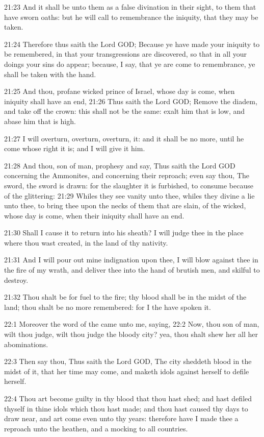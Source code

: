 21:23 And it shall be unto them as a false divination in their sight,
to them that have sworn oaths: but he will call to remembrance the
iniquity, that they may be taken.

21:24 Therefore thus saith the Lord GOD; Because ye have made your
iniquity to be remembered, in that your transgressions are discovered,
so that in all your doings your sins do appear; because, I say, that
ye are come to remembrance, ye shall be taken with the hand.

21:25 And thou, profane wicked prince of Israel, whose day is come,
when iniquity shall have an end, 21:26 Thus saith the Lord GOD; Remove
the diadem, and take off the crown: this shall not be the same: exalt
him that is low, and abase him that is high.

21:27 I will overturn, overturn, overturn, it: and it shall be no
more, until he come whose right it is; and I will give it him.

21:28 And thou, son of man, prophesy and say, Thus saith the Lord GOD
concerning the Ammonites, and concerning their reproach; even say
thou, The sword, the sword is drawn: for the slaughter it is
furbished, to consume because of the glittering: 21:29 Whiles they see
vanity unto thee, whiles they divine a lie unto thee, to bring thee
upon the necks of them that are slain, of the wicked, whose day is
come, when their iniquity shall have an end.

21:30 Shall I cause it to return into his sheath? I will judge thee in
the place where thou wast created, in the land of thy nativity.

21:31 And I will pour out mine indignation upon thee, I will blow
against thee in the fire of my wrath, and deliver thee into the hand
of brutish men, and skilful to destroy.

21:32 Thou shalt be for fuel to the fire; thy blood shall be in the
midst of the land; thou shalt be no more remembered: for I the \LORD
have spoken it.

22:1 Moreover the word of the \LORD came unto me, saying, 22:2 Now,
thou son of man, wilt thou judge, wilt thou judge the bloody city?
yea, thou shalt shew her all her abominations.

22:3 Then say thou, Thus saith the Lord GOD, The city sheddeth blood
in the midst of it, that her time may come, and maketh idols against
herself to defile herself.

22:4 Thou art become guilty in thy blood that thou hast shed; and hast
defiled thyself in thine idols which thou hast made; and thou hast
caused thy days to draw near, and art come even unto thy years:
therefore have I made thee a reproach unto the heathen, and a mocking
to all countries.

